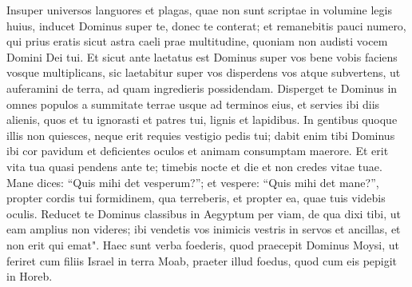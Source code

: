 \begin{biblechapter}
\verse Insuper universos languores et plagas, quae non sunt scriptae in volumine legis huius, inducet Dominus super te, donec te conterat; 
\verse et remanebitis pauci numero, qui prius eratis sicut astra caeli prae multitudine, quoniam non audisti vocem Domini Dei tui. 
\verse Et sicut ante laetatus est Dominus super vos bene vobis faciens vosque multiplicans, sic laetabitur super vos disperdens vos atque subvertens, ut auferamini de terra, ad quam ingredieris possidendam. 
\verse Disperget te Dominus in omnes populos a summitate terrae usque ad terminos eius, et servies ibi diis alienis, quos et tu ignorasti et patres tui, lignis et lapidibus.  
\verse In gentibus quoque illis non quiesces, neque erit requies vestigio pedis tui; dabit enim tibi Dominus ibi cor pavidum et deficientes oculos et animam consumptam maerore. 
\verse Et erit vita tua quasi pendens ante te; timebis nocte et die et non credes vitae tuae. 
\verse Mane dices: “Quis mihi det vesperum?”; et vespere: “Quis mihi det mane?”, propter cordis tui formidinem, qua terreberis, et propter ea, quae tuis videbis oculis. 
\verse Reducet te Dominus classibus in Aegyptum per viam, de qua dixi tibi, ut eam amplius non videres; ibi vendetis vos inimicis vestris in servos et ancillas, et non erit qui emat". 
\verse Haec sunt verba foederis, quod praecepit Dominus Moysi, ut feriret cum filiis Israel in terra Moab, praeter illud foedus, quod cum eis pepigit in Horeb. 
\end{biblechapter}

